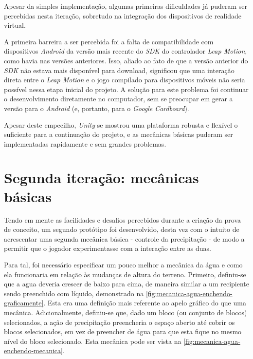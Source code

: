 Apesar da simples implementação, algumas primeiras dificuldades já puderam 
ser percebidas nesta iteração, sobretudo na integração dos dispositivos de 
realidade virtual.

A primeira barreira a ser percebida foi a falta de compatibilidade com 
dispositivos \textit{Android} da versão mais recente do \textit{SDK} do 
controlador \textit{Leap Motion}, como havia nas versões anteriores. Isso, aliado 
ao fato de que a versão anterior do \textit{SDK} não estava mais disponível 
para download, significou que uma interação direta entre o \textit{Leap Motion} 
e o jogo compilado para dispositivos móveis não seria possível nessa etapa 
inicial do projeto. A solução para este problema foi continuar o desenvolvimento
diretamente no computador, sem se preocupar em gerar a versão para o 
\textit{Android} (e, portanto, para o \textit{Google Cardboard}).

Apesar deste empecilho, \textit{Unity} se mostrou uma plataforma robusta e 
flexível o suficiente para a continuação do projeto, e as mecânicas básicas 
puderam ser implementadas rapidamente e sem grandes problemas.

\section{Segunda iteração: mecânicas básicas}\label{sec-segunda-iteracao-mecanicas-basicas}

Tendo em mente as facilidades e desafios percebidos durante a criação da prova 
de conceito, um segundo protótipo foi desenvolvido, desta vez com o intuito 
de acrescentar uma segunda mecânica básica - controle da precipitação - de modo
a permitir que o jogador experimentasse com a interação entre as duas.

Para tal, foi necessário especificar um pouco melhor a mecânica da água 
e como ela funcionaria em relação às mudanças de altura do terreno. 
Primeiro, definiu-se que a agua deveria crescer de baixo para cima, de
maneira similar a um recipiente sendo preenchido com líquido, demonstrado
na \autoref{fig:mecanica-agua-enchendo-graficamente}. Esta era uma
definição mais referente ao apelo gráfico do que uma mecânica. Adicionalmente, 
definiu-se que, dado um bloco (ou conjunto de blocos) selecionados, a ação de
precipitação preencheria o espaço aberto até cobrir os blocos selecionados, em 
vez de preencher de água para que esta fique no mesmo nível do bloco selecionado.
Esta mecânica pode ser vista na \autoref{fig:mecanica-agua-enchendo-mecanica}.

